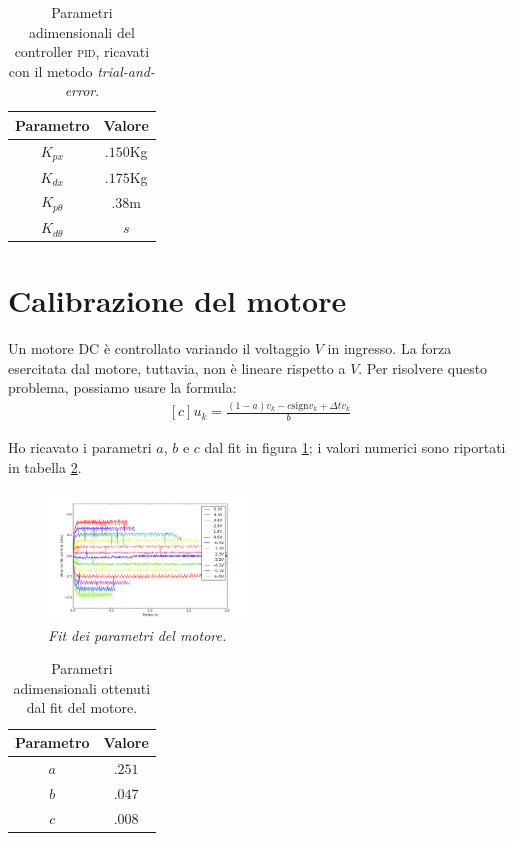 \begin{table}[H]
  \centering
  \begin{tabular}[t]{cc}
    \toprule
    Parametro &Valore\\
    \midrule
    $K_{px}$ & $.150$Kg \\
    $K_{dx}$ & $.175$Kg \\
    $K_{p\theta} $ & $.38$m   \\
    $K_{d\theta}$ & $s$ \\
    \bottomrule
  \end{tabular}
  \caption{
    Parametri adimensionali del controller \textsc{pid}, ricavati con il metodo \emph{trial-and-error}.
  }
  \label{tab:coefficienti-pid}
\end{table}

\section{Calibrazione del motore}\label{sec:calibrazione-motore}
Un motore DC è controllato variando il voltaggio $V$ in ingresso. La forza esercitata dal motore, tuttavia, non è
lineare rispetto a $V$. Per risolvere questo problema, possiamo usare la formula\cite{dcControl}:
  \begin{equation}
    \begin{aligned}[c]
      u_k = \frac {(1-a)v_k -c \text{sign} v_k + \Delta t \dot v_k} {b}
    \end{aligned}
    \label{eq:motore}
  \end{equation}

Ho ricavato i parametri $a$, $b$ e $c$ dal fit in figura \ref{fig:fit}; i valori numerici sono riportati in tabella \ref{tab:fit}.

\begin{figure}[h]
  \includegraphics[width=0.47\textwidth]{../assets/fit.png} %
  \caption{\emph{Fit dei parametri del motore.}}
  \label{fig:fit}
\end{figure}

\begin{table}[H]
  \centering
  \begin{tabular}[t]{cc}
    \toprule
    Parametro &Valore\\
    \midrule
    $a$ & $.251$ \\
    $b$ & $.047$ \\
    $c$ & $.008$ \\
    \bottomrule
  \end{tabular}
  \caption{
    Parametri adimensionali ottenuti dal fit del motore.
  }
  \label{tab:fit}
\end{table}

